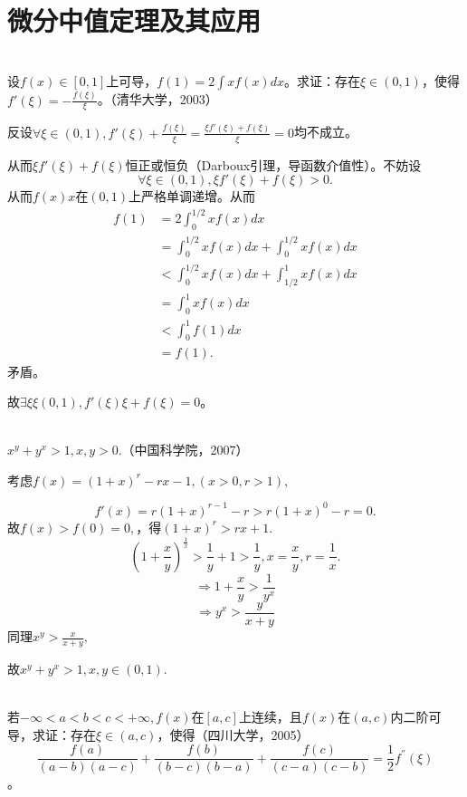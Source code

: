   \hfill\\

  \section{微分中值定理及其应用}
  \begin{example}
  \hfill\\
  设$f(x)\in[0,1]$上可导，$f(1)=2\int xf(x)dx$。求证：存在$\xi\in(0,1)$，使得$f'(\xi)=-\frac{f(\xi)}{\xi}$。（清华大学，2003）
  
  
  反设$\forall\xi\in(0,1),f'(\xi)+\frac{f(\xi)}{\xi}=\frac{\xi f'(\xi)+f(\xi)}{\xi}=0$均不成立。
  
  从而$\xi f'(\xi)+f(\xi)$恒正或恒负（Darboux引理，导函数介值性）。不妨设
  $$\forall\xi\in(0,1),\xi f'(\xi)+f(\xi)>0.$$
  从而$f(x)x$在$(0,1)$上严格单调递增。从而
  \[
  \begin{aligned}
  f(1)&=2\int_0^{1/2}xf(x)dx\\
  &=\int_0^{1/2}xf(x)dx+\int_0^{1/2}xf(x)dx\\
  &<\int_0^{1/2}xf(x)dx+\int_{1/2}^1xf(x)dx\\
  &=\int_0^1xf(x)dx\\
  &<\int_0^1f(1)dx\\
  &=f(1).
  \end{aligned}
  \]
  矛盾。
  
  故$\exists\xi\xi(0,1),f'(\xi)\xi+f(\xi)=0$。
  \end{example}
  \begin{example}
  \hfill\\
  $x^y+y^x>1,x,y>0$.（中国科学院，2007）
  
  
  考虑$f(x)=(1+x)^r-rx-1,(x>0,r>1)$,
  
  $$f'(x)=r(1+x)^{r-1}-r>r(1+x)^0-r=0.$$
  故$f(x)>f(0)=0,$，得$(1+x)^r>rx+1.$
  $$(1+\frac{x}{y})^{\frac1x}>\frac1y+1>\frac1y,x=\frac xy,r=\frac1x.$$
  $$\Longrightarrow 1+\frac xy>\frac{1}{y^x}$$
  $$\Longrightarrow y^x>\frac{y}{x+y}$$
  同理$x^y>\frac{x}{x+y},$
  
  故$x^y+y^x>1,x,y\in(0,1).$ 
  \end{example}
  \begin{example}
  \hfill\\
   若$-\infty<a<b<c<+\infty,f(x)$在$[a,c]$上连续，且$f(x)$在$(a,c)$内二阶可导，求证：存在$\xi\in(a,c)$，使得（四川大学，2005）$$\frac{f(a)}{(a-b)(a-c)}+\frac{f(b)}{(b-c)(b-a)}+\frac{f(c)}{(c-a)(c-b)}=\frac12f^{''}(\xi)$$。
\end{example}
